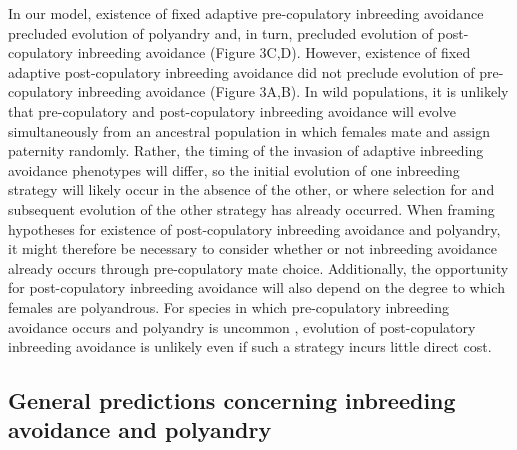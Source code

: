 \documentclass[10pt,letterpaper]{article}
\begin{document}
In our model, existence of fixed adaptive pre-copulatory inbreeding avoidance precluded evolution of polyandry and, in turn, precluded evolution of post-copulatory inbreeding avoidance (Figure 3C,D). However, existence of fixed adaptive post-copulatory inbreeding avoidance did not preclude evolution of pre-copulatory inbreeding avoidance (Figure 3A,B). In wild populations, it is unlikely that pre-copulatory and post-copulatory inbreeding avoidance will evolve simultaneously from an ancestral population in which females mate and assign paternity randomly. Rather, the timing of the invasion of adaptive inbreeding avoidance phenotypes will differ, so the initial evolution of one inbreeding strategy will likely occur in the absence of the other, or where selection for and subsequent evolution of the other strategy has already occurred. When framing hypotheses for existence of post-copulatory inbreeding avoidance and polyandry, it might therefore be necessary to consider whether or not inbreeding avoidance already occurs through pre-copulatory mate choice. Additionally, the opportunity for post-copulatory inbreeding avoidance will also depend on the degree to which females are polyandrous. For species in which pre-copulatory inbreeding avoidance occurs and polyandry is uncommon \cite[][]{Lihoreau2007, Metzger2010, Metzger2010a}, evolution of post-copulatory inbreeding avoidance is unlikely even if such a strategy incurs little direct cost. 


\subsection*{General predictions concerning inbreeding avoidance and polyandry}
\end{document}

